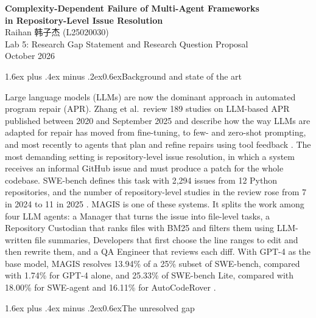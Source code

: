 \documentclass[10pt,a4paper]{article}
\makeatletter
\renewcommand\section{\@startsection{section}{1}{\z@}%
  {1.6ex plus .4ex minus .2ex}{0.6ex}{\normalfont\normalsize\bfseries}}
\makeatother
\begin{document}
\begin{center}
{\large\bfseries Complexity-Dependent Failure of Multi-Agent Frameworks\\[2pt]
in Repository-Level Issue Resolution}\\[6pt]
Raihan {\zhfont 韩子杰} (L25020030)\\
Lab 5: Research Gap Statement and Research Question Proposal\\
October 2026
\end{center}
\vspace{2pt}

\section{Background and state of the art}

Large language models (LLMs) are now the dominant approach in automated program repair (APR). Zhang et al.\ review 189 studies on LLM-based APR published between 2020 and September 2025 and describe how the way LLMs are adapted for repair has moved from fine-tuning, to few- and zero-shot prompting, and most recently to agents that plan and refine repairs using tool feedback \cite[\S6.2.5]{zhang2026slr}. The most demanding setting is repository-level issue resolution, in which a system receives an informal GitHub issue and must produce a patch for the whole codebase. SWE-bench \cite{jimenez2024swebench} defines this task with 2,294 issues from 12 Python repositories, and the number of repository-level studies in the review rose from 7 in 2024 to 11 in 2025 \cite[Table~8]{zhang2026slr}. MAGIS \cite{tao2024magis} is one of these systems. It splits the work among four LLM agents: a Manager that turns the issue into file-level tasks, a Repository Custodian that ranks files with BM25 and filters them using LLM-written file summaries, Developers that first choose the line ranges to edit and then rewrite them, and a QA Engineer that reviews each diff. With GPT-4 as the base model, MAGIS resolves 13.94\% of a 25\% subset of SWE-bench, compared with 1.74\% for GPT-4 alone, and 25.33\% of SWE-bench Lite, compared with 18.00\% for SWE-agent and 16.11\% for AutoCodeRover \cite[Tables~2 and~4]{tao2024magis}.

\section{The unresolved gap}
\end{document}
